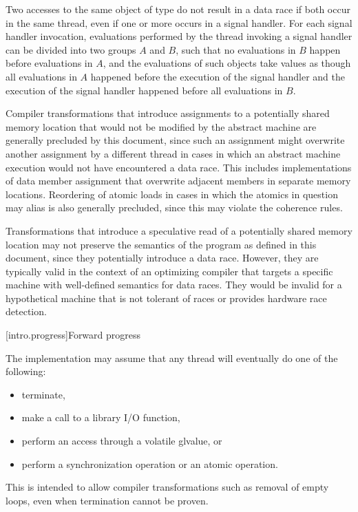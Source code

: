 \pnum
Two accesses to the same object of type  do not
result in a data race if both occur in the same thread, even if one or more
occurs in a signal handler. For each signal handler invocation, evaluations
performed by the thread invoking a signal handler can be divided into two
groups $A$ and $B$, such that no evaluations in
$B$ happen before evaluations in $A$, and the
evaluations of such  objects take values as though
all evaluations in $A$ happened before the execution of the signal
handler and the execution of the signal handler happened before all evaluations
in $B$.

\pnum
\begin{note}
Compiler transformations that introduce assignments to a potentially
shared memory location that would not be modified by the abstract machine are
generally precluded by this document, since such an assignment might overwrite
another assignment by a different thread in cases in which an abstract machine
execution would not have encountered a data race. This includes implementations
of data member assignment that overwrite adjacent members in separate memory
locations. Reordering of atomic loads in cases in which the atomics in question
may alias is also generally precluded, since this may violate the coherence
rules.
\end{note}

\pnum
\begin{note}
Transformations that introduce a speculative read of a potentially
shared memory location may not preserve the semantics of the \Cpp{} program as
defined in this document, since they potentially introduce a data race. However,
they are typically valid in the context of an optimizing compiler that targets a
specific machine with well-defined semantics for data races. They would be
invalid for a hypothetical machine that is not tolerant of races or provides
hardware race detection.
\end{note}

[intro.progress]{Forward progress}

\pnum
The implementation may assume that any thread will eventually do one of the
following:
\begin{itemize}
\item terminate,
\item make a call to a library I/O function,
\item perform an access through a volatile glvalue, or
\item perform a synchronization operation or an atomic operation.
\end{itemize}
\begin{note}
This is intended to allow compiler transformations such as removal of
empty loops, even when termination cannot be proven.
\end{note}

